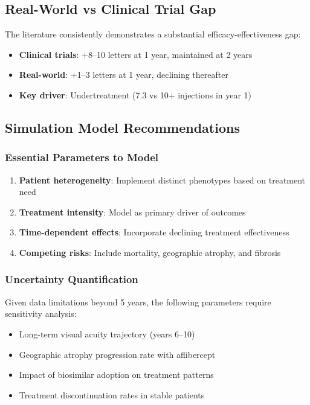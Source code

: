 \subsection{Real-World vs Clinical Trial Gap}

The literature consistently demonstrates a substantial efficacy-effectiveness gap:
\begin{itemize}
    \item \textbf{Clinical trials}: +8--10 letters at 1 year, maintained at 2 years
    \item \textbf{Real-world}: +1--3 letters at 1 year, declining thereafter
    \item \textbf{Key driver}: Undertreatment (7.3 vs 10+ injections in year 1)
\end{itemize}

\subsection{Simulation Model Recommendations}

\subsubsection{Essential Parameters to Model}
\begin{enumerate}
    \item \textbf{Patient heterogeneity}: Implement distinct phenotypes based on treatment need
    \item \textbf{Treatment intensity}: Model as primary driver of outcomes
    \item \textbf{Time-dependent effects}: Incorporate declining treatment effectiveness
    \item \textbf{Competing risks}: Include mortality, geographic atrophy, and fibrosis
\end{enumerate}

\subsubsection{Uncertainty Quantification}
Given data limitations beyond 5 years, the following parameters require sensitivity analysis:
\begin{itemize}
    \item Long-term visual acuity trajectory (years 6--10)
    \item Geographic atrophy progression rate with aflibercept
    \item Impact of biosimilar adoption on treatment patterns
    \item Treatment discontinuation rates in stable patients
\end{itemize}

